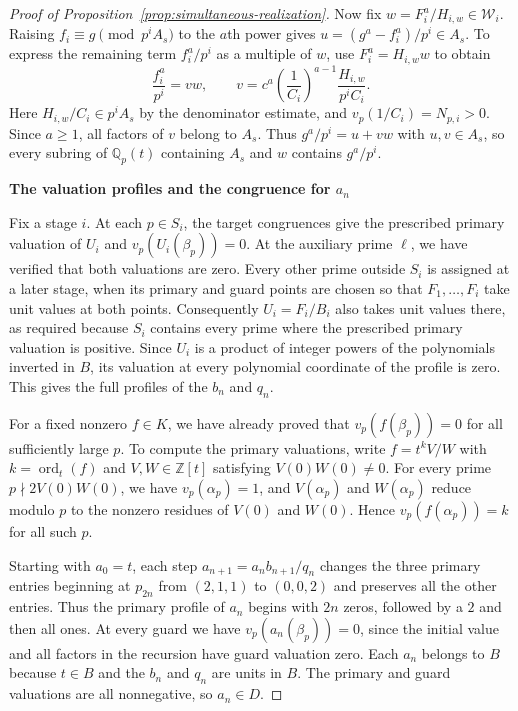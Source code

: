 \documentclass{article}
\newcommand{\proofheading}[1]{%
    \par\addvspace{\smallskipamount}%
    \noindent\textbf{#1}\par\nobreak
}
\DeclareMathOperator{\ord}{ord}
\theoremstyle{remark}
\begin{document}
\begin{proof}[Proof of Proposition~\ref{prop:simultaneous-realization}]
    Now fix $w = F_i^a/H_{i, w} \in \mathcal{W}_i$.
    Raising $f_i \equiv g \pmod{p^i A_s}$ to the $a$th power gives $u = (g^a - f_i^a)/p^i \in A_s$.
    To express the remaining term $f_i^a/p^i$ as a multiple of $w$, use $F_i^a = H_{i, w}w$ to obtain
    \[
        \frac{f_i^a}{p^i} = v w, \qquad
        v = c^a \left(\frac{1}{C_i}\right)^{a - 1} \frac{H_{i, w}}{p^i C_i}.
    \]
    Here $H_{i, w}/C_i \in p^i A_s$ by the denominator estimate, and $v_p(1/C_i) = N_{p, i} > 0$.
    Since $a \ge 1$, all factors of $v$ belong to $A_s$.
    Thus $g^a/p^i = u + v w$ with $u, v \in A_s$, so every subring of $\mathbb{Q}_p(t)$ containing $A_s$ and $w$ contains $g^a/p^i$.

    \proofheading{The valuation profiles and the congruence for $a_n$}
    Fix a stage $i$.
    At each $p \in S_i$, the target congruences give the prescribed primary valuation of $U_i$ and $v_p(U_i(\beta_p)) = 0$.
    At the auxiliary prime $\ell$, we have verified that both valuations are zero.
    Every other prime outside $S_i$ is assigned at a later stage, when its primary and guard points are chosen so that $F_1, \ldots, F_i$ take unit values at both points.
    Consequently $U_i = F_i/B_i$ also takes unit values there, as required because $S_i$ contains every prime where the prescribed primary valuation is positive.
    Since $U_i$ is a product of integer powers of the polynomials inverted in $B$, its valuation at every polynomial coordinate of the profile is zero.
    This gives the full profiles of the $b_n$ and $q_n$.

    For a fixed nonzero $f \in K$, we have already proved that $v_p(f(\beta_p)) = 0$ for all sufficiently large $p$.
    To compute the primary valuations, write $f = t^k V/W$ with $k = \ord_t(f)$ and $V, W \in \mathbb{Z}[t]$ satisfying $V(0)W(0) \ne 0$.
    For every prime $p \nmid 2V(0)W(0)$, we have $v_p(\alpha_p) = 1$, and $V(\alpha_p)$ and $W(\alpha_p)$ reduce modulo $p$ to the nonzero residues of $V(0)$ and $W(0)$.
    Hence $v_p(f(\alpha_p)) = k$ for all such $p$.

    Starting with $a_0 = t$, each step $a_{n + 1} = a_n b_{n + 1}/q_n$ changes the three primary entries beginning at $p_{2n}$ from $(2, 1, 1)$ to $(0, 0, 2)$ and preserves all the other entries.
    Thus the primary profile of $a_n$ begins with $2n$ zeros, followed by a $2$ and then all ones.
    At every guard we have $v_p(a_n(\beta_p)) = 0$, since the initial value and all factors in the recursion have guard valuation zero.
    Each $a_n$ belongs to $B$ because $t \in B$ and the $b_n$ and $q_n$ are units in $B$.
    The primary and guard valuations are all nonnegative, so $a_n \in D$.


\end{proof}
\end{document}
